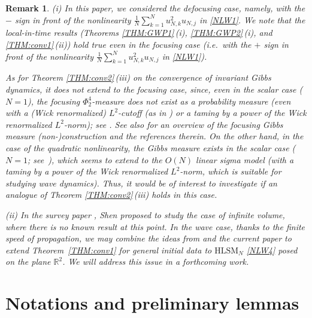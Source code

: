\documentclass[letterpaper, 11pt,  reqno]{amsart}
\newtheorem{remark}[theorem]{Remark}
\newcommand{\1}{\hspace{0.5mm}\text{I}\hspace{0.2mm}}
\newcommand{\noi}{\noindent}
\newcommand{\R}{\mathbb{R}}
\newcommand{\HLS}{$\text{HLSM}_N$ }
\numberwithin{equation}{section}
\numberwithin{theorem}{section}
\begin{document}
\begin{remark}\rm 
(i) In this paper, we considered the defocusing case, namely, 
with the $-$ sign in front of the nonlinearity
$ \frac 1N \sum_{k = 1}^N u_{N, k}^2 u_{N, j}$
in \eqref{NLW1}.
We note that the local-in-time results
(Theorems \ref{THM:GWP1}\,(i), 
\ref{THM:GWP2}\,(i), and 
\ref{THM:conv1}\,(ii))
hold true even in the focusing case
(i.e.~with the $+$ sign in front of the nonlinearity
$ \frac 1N \sum_{k = 1}^N u_{N, k}^2 u_{N, j}$
in \eqref{NLW1}).


As for Theorem \ref{THM:conv2}\,(iii)
on the convergence of invariant Gibbs dynamics, 
it does not extend to the focusing case, 
since, even in the scalar case ($N = 1$), 
the focusing $\Phi^4_2$-measure
does not exist as a probability measure
(even with a (Wick renormalized) $L^2$-cutoff 
(as in \cite{LRS, BO96})
or a taming by a power of the Wick renormalized $L^2$-norm); 
see \cite{BS, OST2, GOTT}.
See also 
\cite{OST1, OOT1, OOT}
for an overview of the focusing Gibbs measure
(non-)construction and the references therein.
On the other hand, 
in the case of the quadratic nonlinearity, 
the Gibbs measure exists in the scalar case ($N = 1$; see~\cite{OST2}),
which seems to  extend to the $O(N)$ linear sigma model
(with a taming by a power of the Wick renormalized $L^2$-norm,
which is suitable for studying wave dynamics).
Thus, it would be of interest to investigate if an analogue
of Theorem \ref{THM:conv2}\,(iii) holds  in this case.


\medskip

\noi
(ii) In the survey paper \cite[Section 9]{Shen}, 
Shen 
proposed to study the case of infinite volume, 
where there is no known result at this point.
In the wave case, thanks to the finite speed of propagation, 
we may combine the ideas
from \cite{Tolo1} and the current paper
to extend 
Theorem~\ref{THM:conv1}
for general initial data
to \HLS \eqref{NLW4} posed on the plane $\R^2$.
We will address this issue
in a forthcoming work.





\end{remark}














\section{Notations and preliminary lemmas}
\end{document}
